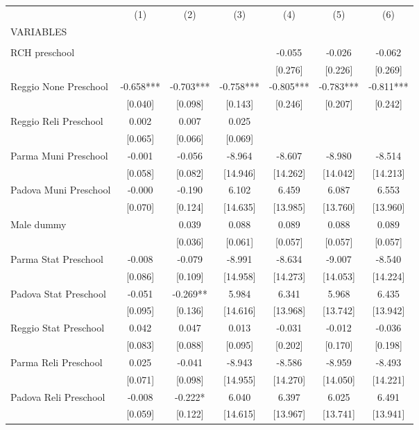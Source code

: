 \begin{tabular}{lcccccc} \hline
 & (1) & (2) & (3) & (4) & (5) & (6) \\
VARIABLES &  &  &  &  &  &  \\ \hline
 &  &  &  &  &  &  \\
RCH preschool &  &  &  & -0.055 & -0.026 & -0.062 \\
 &  &  &  & [0.276] & [0.226] & [0.269] \\
Reggio None Preschool & -0.658*** & -0.703*** & -0.758*** & -0.805*** & -0.783*** & -0.811*** \\
 & [0.040] & [0.098] & [0.143] & [0.246] & [0.207] & [0.242] \\
Reggio Reli Preschool & 0.002 & 0.007 & 0.025 &  &  &  \\
 & [0.065] & [0.066] & [0.069] &  &  &  \\
Parma Muni Preschool & -0.001 & -0.056 & -8.964 & -8.607 & -8.980 & -8.514 \\
 & [0.058] & [0.082] & [14.946] & [14.262] & [14.042] & [14.213] \\
Padova Muni Preschool & -0.000 & -0.190 & 6.102 & 6.459 & 6.087 & 6.553 \\
 & [0.070] & [0.124] & [14.635] & [13.985] & [13.760] & [13.960] \\
Male dummy &  & 0.039 & 0.088 & 0.089 & 0.088 & 0.089 \\
 &  & [0.036] & [0.061] & [0.057] & [0.057] & [0.057] \\
Parma Stat Preschool & -0.008 & -0.079 & -8.991 & -8.634 & -9.007 & -8.540 \\
 & [0.086] & [0.109] & [14.958] & [14.273] & [14.053] & [14.224] \\
Padova Stat Preschool & -0.051 & -0.269** & 5.984 & 6.341 & 5.968 & 6.435 \\
 & [0.095] & [0.136] & [14.616] & [13.968] & [13.742] & [13.942] \\
Reggio Stat Preschool & 0.042 & 0.047 & 0.013 & -0.031 & -0.012 & -0.036 \\
 & [0.083] & [0.088] & [0.095] & [0.202] & [0.170] & [0.198] \\
Parma Reli Preschool & 0.025 & -0.041 & -8.943 & -8.586 & -8.959 & -8.493 \\
 & [0.071] & [0.098] & [14.955] & [14.270] & [14.050] & [14.221] \\
Padova Reli Preschool & -0.008 & -0.222* & 6.040 & 6.397 & 6.025 & 6.491 \\
 & [0.059] & [0.122] & [14.615] & [13.967] & [13.741] & [13.941] \\

\end{tabular}
